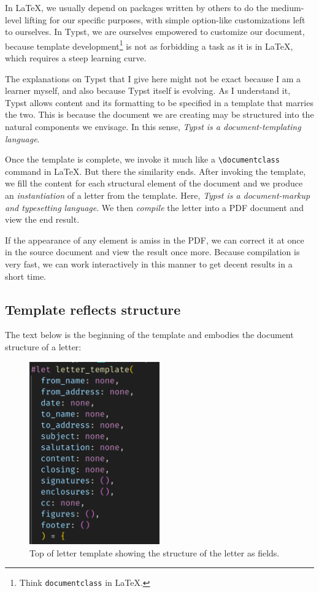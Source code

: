 \documentclass[
  a4paper,
]{article}
\begin{document}
In LaTeX, we usually depend on packages written by others to do the
medium-level lifting for our specific purposes, with simple option-like
customizations left to ourselves. In Typst, we are ourselves empowered
to customize our document, because template development\footnote{Think
  \texttt{documentclass} in LaTeX.} is not as forbidding a task as it is
in LaTeX, which requires a steep learning curve.

The explanations on Typst that I give here might not be exact because I
am a learner myself, and also because Typst itself is evolving. As I
understand it, Typst allows content and its formatting to be specified
in a template that marries the two. This is because the document we are
creating may be structured into the natural components we envisage. In
this sense, \emph{Typst is a document-templating language}.

Once the template is complete, we invoke it much like a
\texttt{\textbackslash{}documentclass} command in LaTeX. But there the
similarity ends. After invoking the template, we fill the content for
each structural element of the document and we produce an
\emph{instantiation} of a letter from the template. Here, \emph{Typst is
a document-markup and typesetting language}. We then \emph{compile} the
letter into a PDF document and view the end result.

If the appearance of any element is amiss in the PDF, we can correct it
at once in the source document and view the result once more. Because
compilation is very fast, we can work interactively in this manner to
get decent results in a short time.

\subsection{Template reflects
structure}\label{template-reflects-structure}

The text below is the beginning of the template and embodies the
document structure of a letter:

\begin{figure}
\centering
\includegraphics[width=0.5\textwidth,height=\textheight]{images/letter-template-top.png}
\caption{Top of letter template showing the structure of the letter as
fields.}\label{fig:template}
\end{figure}
\end{document}
